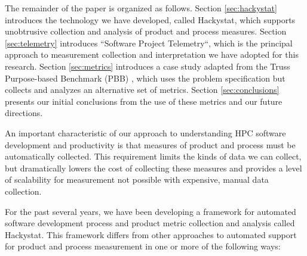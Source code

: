 \documentclass[10pt,twocolumn]{article}
\begin{document}
The remainder of the paper is organized as follows.  Section
\ref{sec:hackystat} introduces the technology we have developed, called
Hackystat, which supports unobtrusive collection and analysis of product
and process measures. Section \ref{sec:telemetry} introduces ``Software
Project Telemetry``, which is the principal approach to measurement
collection and interpretation we have adopted for this research.  Section
\ref{sec:metrics} introduces a case study adapted from the Truss Purpose-based
Benchmark (PBB) \cite{Gustafson04}, which uses the problem specification but 
collects and analyzes an alternative set of metrics.  Section
\ref{sec:conclusions} presents our initial conclusions from the use of
these metrics and our future directions.

\label{sec:hackystat}

An important characteristic of our approach to understanding HPC
software development and productivity is that measures of product and
process must be automatically collected.  This requirement limits the
kinds of data we can collect, but dramatically lowers the cost of
collecting these measures and provides a level of scalability for
measurement not possible with expensive, manual data collection.

For the past several years, we have been developing a framework for
automated software development process and product metric collection
and analysis called Hackystat.  This framework differs from other
approaches to automated support for product and process measurement in
one or more of the following ways:
\end{document}
